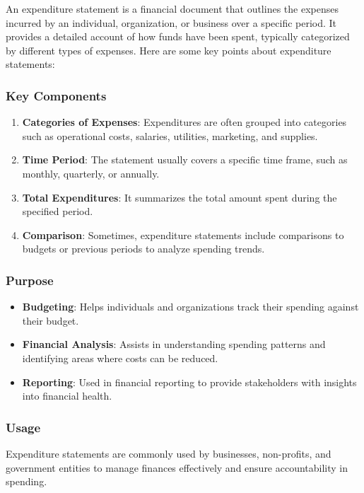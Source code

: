\begin{botresponse}

An expenditure statement is a financial document that outlines the expenses incurred by an individual, organization, or business over a specific period. It provides a detailed account of how funds have been spent, typically categorized by different types of expenses. Here are some key points about expenditure statements:

\subsubsection{Key Components}

\begin{enumerate}
\item \textbf{Categories of Expenses}: Expenditures are often grouped into categories such as operational costs, salaries, utilities, marketing, and supplies.
\item \textbf{Time Period}: The statement usually covers a specific time frame, such as monthly, quarterly, or annually.
\item \textbf{Total Expenditures}: It summarizes the total amount spent during the specified period.
\item \textbf{Comparison}: Sometimes, expenditure statements include comparisons to budgets or previous periods to analyze spending trends.
\end{enumerate}

\subsubsection{Purpose}

\begin{itemize}
\item \textbf{Budgeting}: Helps individuals and organizations track their spending against their budget.
\item \textbf{Financial Analysis}: Assists in understanding spending patterns and identifying areas where costs can be reduced.
\item \textbf{Reporting}: Used in financial reporting to provide stakeholders with insights into financial health.
\end{itemize}

\subsubsection{Usage}

Expenditure statements are commonly used by businesses, non-profits, and government entities to manage finances effectively and ensure accountability in spending.

\end{botresponse}

